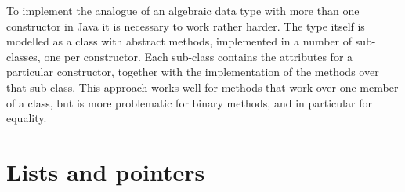 To implement the analogue of an algebraic data type with more than one constructor in Java it is necessary to work rather harder. The type itself is modelled as a class with abstract methods, implemented in a number of sub-classes, one per constructor. Each sub-class contains the attributes for a particular constructor, together with the implementation of the methods over that sub-class. This approach works well for methods that work over one member of a class, but is more problematic for binary methods, and in particular for equality.




\section*{Lists and pointers}
\vspace{-5pt}


